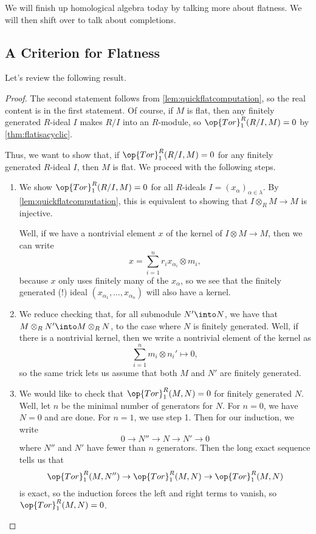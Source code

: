 
We will finish up homological algebra today by talking more about flatness. We will then shift over to talk about completions.

\subsection{A Criterion for Flatness}
Let's review the following result.
\flatcondition*
\begin{proof}
	The second statement follows from \autoref{lem:quickflatcomputation}, so the real content is in the first statement. Of course, if $M$ is flat, then any finitely generated $R$-ideal $I$ makes $R/I$ into an $R$-module, so $\op{Tor}_1^R(R/I,M)=0$ by \autoref{thm:flatisacyclic}.
	
	Thus, we want to show that, if $\op{Tor}_1^R(R/I,M)=0$ for any finitely generated $R$-ideal $I$, then $M$ is flat. We proceed with the following steps.
	\begin{enumerate}
		\item We show $\op{Tor}_1^R(R/I,M)=0$ for all $R$-ideals $I=(x_\alpha)_{\alpha\in\lambda}$. By \autoref{lem:quickflatcomputation}, this is equivalent to showing that $I\otimes_RM\to M$ is injective.
		
		Well, if we have a nontrivial element $x$ of the kernel of $I\otimes M\to M$, then we can write
		\[x=\sum_{i=1}^nr_ix_{\alpha_i}\otimes m_i,\]
		because $x$ only uses finitely many of the $x_\alpha$, so we see that the finitely generated (!) ideal $(x_{\alpha_1},\ldots,x_{\alpha_n})$ will also have a kernel.
		\item We reduce checking that, for all submodule $N'\into N$, we have that $M\otimes_RN'\into M\otimes_RN$, to the case where $N$ is finitely generated. Well, if there is a nontrivial kernel, then we write a nontrivial element of the kernel as
		\[\sum_{i=1}^nm_i\otimes n_i'\mapsto0,\]
		so the same trick lets us assume that both $M$ and $N'$ are finitely generated.

		\item We would like to check that $\op{Tor}_1^R(M,N)=0$ for finitely generated $N$. Well, let $n$ be the minimal number of generators for $N$. For $n=0$, we have $N=0$ and are done. For $n=1$, we use step 1. Then for our induction, we write
		\[0\to N''\to N\to N'\to0\]
		where $N''$ and $N'$ have fewer than $n$ generators. Then the long exact sequence tells us that
		\[\op{Tor}_1^R(M,N'')\to\op{Tor}_1^R(M,N)\to\op{Tor}_1^R(M,N)\]
		is exact, so the induction forces the left and right terms to vanish, so $\op{Tor}_1^R(M,N)=0$.
		\qedhere
	\end{enumerate}
\end{proof}
